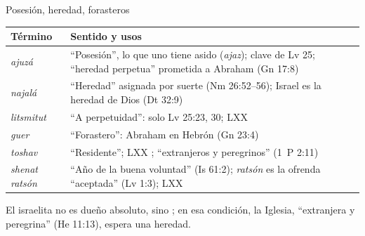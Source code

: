 \begin{frame}{Posesión, heredad, forasteros}
\scriptsize\renewcommand{\arraystretch}{1.15}
\begin{tabular}{@{}L{2.7cm}L{9.2cm}@{}}
\toprule
\textbf{Término} & \textbf{Sentido y usos} \\ \midrule
{} \emph{ajuzá} & ``Posesión'', lo que uno tiene asido (\emph{ajaz}); clave de Lv 25; ``heredad perpetua'' prometida a Abraham (Gn 17:8) \\
 \emph{najalá} & ``Heredad'' asignada por suerte (Nm 26:52--56); Israel es la heredad de Dios (Dt 32:9) \\
 \emph{litsmitut} & ``A perpetuidad'': solo Lv 25:23, 30; LXX  \\
 \emph{guer} & ``Forastero'': Abraham en Hebrón (Gn 23:4) \\
 \emph{toshav} & ``Residente''; LXX ; ``extranjeros y peregrinos'' (1~P 2:11) \\
 \emph{shenat ratsón} & ``Año de la buena voluntad'' (Is 61:2); \emph{ratsón} es la ofrenda ``aceptada'' (Lv 1:3); LXX  \\
\bottomrule
\end{tabular}\par\medskip
\small El israelita no es dueño absoluto, sino ; en esa condición, la Iglesia, ``extranjera y peregrina'' (He 11:13), espera una heredad.
\end{frame}

